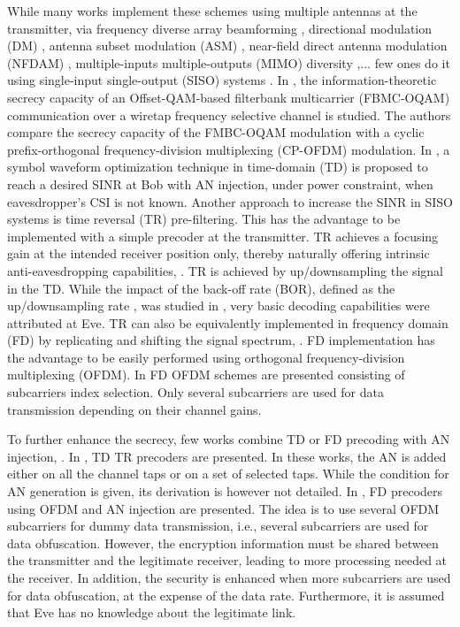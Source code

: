 \documentclass[journal,comsoc]{IEEEtran}
\begin{document}
While many works implement these schemes using multiple antennas at the transmitter, via frequency diverse array beamforming \cite{li_qiang_2018_1159254,8078202}, directional modulation (DM) \cite{5159486},  antenna subset modulation (ASM) \cite{6544472}, near-field direct antenna modulation (NFDAM) \cite{4684619,4523120}, multiple-inputs multiple-outputs (MIMO) diversity \cite{5580113,7070667,8786136,5738303},... few ones do it using single-input single-output (SISO) systems \cite{li2013waveform,9003692,8093595,8093591,xu2018security,li2018artificial,li2017artificial,9049811,7475864,7041552}.  In \cite{9062307}, the information-theoretic secrecy capacity of an Offset-QAM-based filterbank multicarrier (FBMC-OQAM) communication over a wiretap frequency selective channel is studied. The authors compare the secrecy capacity of the FMBC-OQAM modulation with a cyclic prefix-orthogonal frequency-division multiplexing (CP-OFDM) modulation. In \cite{li2013waveform}, a symbol waveform optimization technique in time-domain (TD) is proposed to reach a desired SINR at Bob with AN injection, under power constraint, when eavesdropper’s CSI is not known. Another approach to increase the SINR in SISO systems is time reversal (TR) pre-filtering. This has the advantage to be implemented with a simple precoder at the transmitter. TR achieves a focusing gain at the intended receiver position only, thereby naturally offering intrinsic anti-eavesdropping capabilities, \cite{9003692,oestges2005characterization}. TR is achieved by up/downsampling the signal in the TD. While the impact of the back-off rate (BOR), defined as the up/downsampling rate \cite{dubois2010use}, was studied in \cite{9003692,9049811}, very basic decoding capabilities were attributed at Eve. TR can also be equivalently implemented in frequency domain (FD) by replicating and shifting the signal spectrum, \cite{8883213}. FD implementation has the advantage to be easily performed using orthogonal frequency-division multiplexing (OFDM). In \cite{8093595,8093591} FD OFDM schemes are presented consisting of subcarriers index selection. Only several subcarriers are used for data transmission depending on their channel gains.

To further enhance the secrecy, few works combine TD or FD precoding with AN injection, \cite{xu2018security,li2018artificial,li2017artificial,7475864,7041552}. In \cite{xu2018security,li2018artificial,li2017artificial}, TD TR precoders are presented. In these works, the AN is added either on all the channel taps or on a set of selected taps. While the condition for AN generation is given, its derivation is however not detailed. In \cite{7475864,7041552}, FD precoders using OFDM and AN injection are presented. The idea is to use several OFDM subcarriers for dummy data transmission, i.e., several subcarriers are used for data obfuscation. However, the encryption information must be shared between the transmitter and the legitimate receiver, leading to more processing needed at the receiver. In addition, the security is enhanced when more subcarriers are used for data obfuscation, at the expense of the data rate. Furthermore, it is assumed that Eve has no knowledge about the legitimate link.
\end{document}
